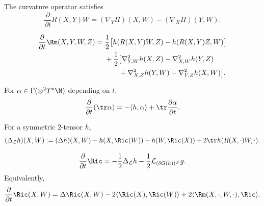 \begin{proposition}
\label{topping:variation-curvature-operator}

The curvature operator satisfies
\[
\frac{\partial}{\partial t}R(X,Y)W=(\nabla_Y\Pi)(X,W)-(\nabla_X\Pi)(Y,W).
\]
\end{proposition}

\begin{proposition}
\label{topping:variation-riemann-tensor}

\[
\begin{aligned}
\frac{\partial}{\partial t}\Rm(X,Y,W,Z)
={}&\frac12\bigl[h(R(X,Y)W,Z)-h(R(X,Y)Z,W)\bigr]\\
&+\frac12\bigl[\nabla^2_{Y,W}h(X,Z)-\nabla^2_{X,W}h(Y,Z)\\
&\qquad+\nabla^2_{X,Z}h(Y,W)-\nabla^2_{Y,Z}h(X,W)\bigr].
\end{aligned}
\]
\end{proposition}

\begin{proposition}
\label{topping:variation-trace}

For $\alpha\in\Gamma(\otimes^2T^*\M)$ depending on $t$,
\[
\frac{\partial}{\partial t}(\tr\alpha)
=-\langle h,\alpha\rangle+\tr\frac{\partial\alpha}{\partial t}.
\]
\end{proposition}

\begin{definition}
\label{topping:variation-lichnerowicz}


For a symmetric $2$-tensor $h$,
\[
(\Delta_{\mathcal L}h)(X,W):=(\Delta h)(X,W)-h(X,\Ric(W))-h(W,\Ric(X))
+2\tr h(R(X,\cdot)W,\cdot).
\]
\end{definition}

\begin{proposition}
\label{topping:variation-ricci}

\[
\frac{\partial}{\partial t}\Ric
=-\frac12\Delta_{\mathcal L}h-\frac12\mathcal L_{(\delta G(h))^\#}g.
\]
Equivalently,
\[
\frac{\partial}{\partial t}\Ric(X,W)
=\Delta\Ric(X,W)-2\langle\Ric(X),\Ric(W)\rangle
+2\langle\Rm(X,\cdot,W,\cdot),\Ric\rangle.
\]
\end{proposition}

